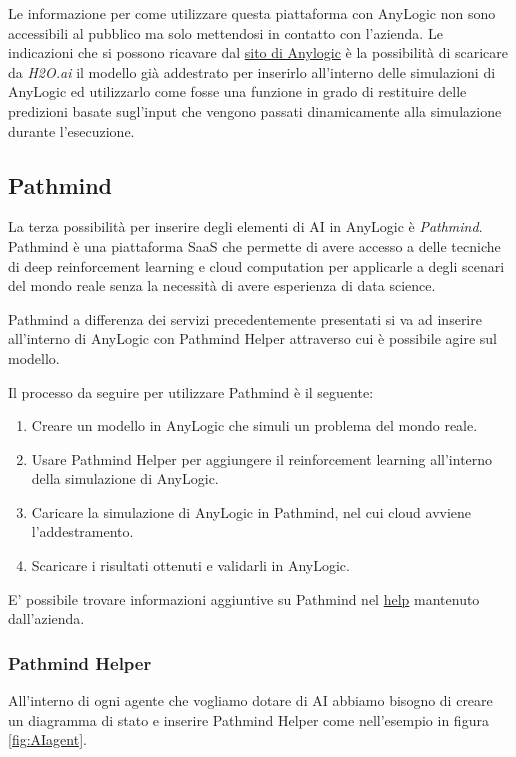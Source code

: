 Le informazione per come utilizzare questa piattaforma con AnyLogic non sono accessibili al pubblico ma solo mettendosi in contatto con l'azienda. 
Le indicazioni che si possono ricavare dal \href{https://www.anylogic.com/features/artificial-intelligence/h2o-ai/}{sito di Anylogic} è la possibilità di scaricare da \textit{H2O.ai }il modello già addestrato per inserirlo all'interno delle simulazioni di AnyLogic ed utilizzarlo come fosse una funzione in grado di restituire delle predizioni basate sugl'input che vengono passati dinamicamente alla simulazione durante l'esecuzione.

\clearpage
\subsection{Pathmind}
La terza possibilità per inserire degli elementi di AI in AnyLogic è \textit{Pathmind}.
\\ Pathmind è una piattaforma SaaS che permette di avere accesso a delle tecniche di deep reinforcement learning e cloud computation per applicarle a degli scenari del mondo reale senza la necessità di avere esperienza di data science.

Pathmind a differenza dei servizi precedentemente presentati si va ad inserire all'interno di AnyLogic con Pathmind Helper attraverso cui è possibile agire sul modello.

Il processo da seguire per utilizzare Pathmind è il seguente: \begin{enumerate}
\item Creare un modello in AnyLogic che simuli un problema del mondo reale.
\item Usare Pathmind Helper per aggiungere il reinforcement learning all'interno della simulazione di AnyLogic.
\item Caricare la simulazione di AnyLogic in Pathmind, nel cui cloud avviene l'addestramento.
\item Scaricare i risultati ottenuti e validarli in AnyLogic.
\end{enumerate}

E' possibile trovare informazioni aggiuntive su Pathmind nel \href{https://help.pathmind.com/en/collections/2106204-tutorials-example-simulation-models#getting-started}{help} mantenuto dall'azienda. 

\clearpage
\subsubsection{Pathmind Helper}
All'interno di ogni agente che vogliamo dotare di AI abbiamo bisogno di creare un diagramma di stato e inserire Pathmind Helper come nell'esempio in figura \ref{fig:AIagent}. 

